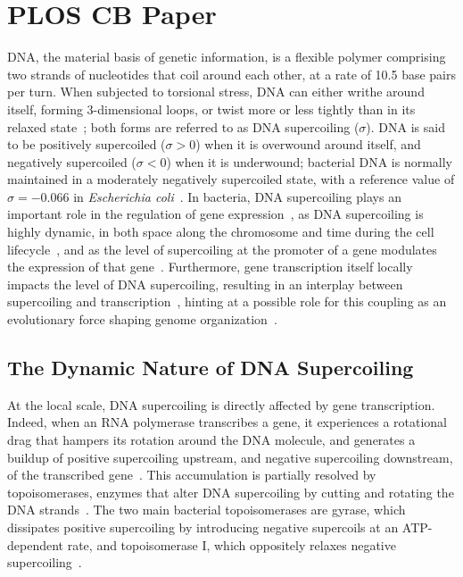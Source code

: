 \section{PLOS CB Paper}

DNA, the material basis of genetic information, is a flexible polymer comprising two strands of nucleotides that coil around each other, at a rate of 10.5 base pairs per turn.
When subjected to torsional stress, DNA can either writhe around itself, forming 3-dimensional loops, or twist more or less tightly than in its relaxed state~\citep{krogh2018}; both forms are referred to as DNA supercoiling ($\sigma$).
DNA is said to be positively supercoiled ($\sigma > 0$) when it is overwound around itself, and negatively supercoiled ($\sigma < 0$) when it is underwound; bacterial DNA is normally maintained in a moderately negatively supercoiled state, with a reference value of $\sigma=-0.066$ in \emph{Escherichia coli}~\citep{crozat2005}.
In bacteria, DNA supercoiling plays an important role in the regulation of gene expression~\citep{martisb.2019}, as DNA supercoiling is highly dynamic, in both space along the chromosome and time during the cell lifecycle~\citep{krogh2018}, and as the level of supercoiling at the promoter of a gene modulates the expression of that gene~\citep{forquet2021}.
Furthermore, gene transcription itself locally impacts the level of DNA supercoiling, resulting in an interplay between supercoiling and transcription~\citep{dorman2019}, hinting at a possible role for this coupling as an evolutionary force shaping genome organization~\citep{junier2016}.

\subsection{The Dynamic Nature of DNA Supercoiling}

At the local scale, DNA supercoiling is directly affected by gene transcription.
Indeed, when an RNA polymerase transcribes a gene, it experiences a rotational drag that hampers its rotation around the DNA molecule, and generates a buildup of positive supercoiling upstream, and negative supercoiling downstream, of the transcribed gene~\citep{liu1987,ma2016}.
This accumulation is partially resolved by topoisomerases, enzymes that alter DNA supercoiling by cutting and rotating the DNA strands~\citep*{duprey2021}.
The two main bacterial topoisomerases are gyrase, which dissipates positive supercoiling by introducing negative supercoils at an ATP-dependent rate, and topoisomerase I, which oppositely relaxes negative supercoiling~\citep{martisb.2019}.

